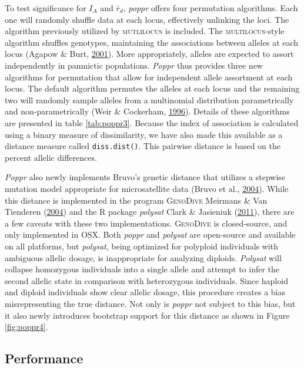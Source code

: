 \documentclass[double,11pt]{beavtex}
\begin{document}
  To test significance for \(I_A\) and \(\bar{r}_d\), \emph{poppr} offers
  four permutation algorithms. Each one will randomly shuffle data at each
  locus, effectively unlinking the loci. The algorithm previously utilized
  by \textsc{mutlilocus} is included. The \textsc{multilocus}-style
  algorithm shuffles genotypes, maintaining the associations between
  alleles at each locus (Agapow \& Burt,
  \protect\hyperlink{ref-Agapow_2001}{2001}). More appropriately, alleles
  are expected to assort independently in panmictic populations.
  \emph{Poppr} thus provides three new algorithms for permutation that
  allow for independent allele assortment at each locus. The default
  algorithm permutes the alleles at each locus and the remaining two will
  randomly sample alleles from a multinomial distribution parametrically
  and non-parametrically (Weir \& Cockerham,
  \protect\hyperlink{ref-weir1996genetic}{1996}). Details of these
  algorithms are presented in table \ref{tab:poppr3}. Because the index of
  association is calculated using a binary measure of dissimilarity, we
  have also made this available as a distance measure called
  \texttt{diss.dist()}. This pairwise distance is based on the percent
  allelic differences.
  
  \emph{Poppr} also newly implements Bruvo's genetic distance that
  utilizes a stepwise mutation model appropriate for microsatellite data
  (Bruvo et al., \protect\hyperlink{ref-bruvo2004simple}{2004}). While
  this distance is implemented in the program \textsc{ GenoDive} Meirmans
  \& Van Tienderen (\protect\hyperlink{ref-meirmans2004genotype}{2004})
  and the R package \emph{polysat} Clark \& Jasieniuk
  (\protect\hyperlink{ref-polysat}{2011}), there are a few caveats with
  these two implementations. \textsc{GenoDive} is closed-source, and only
  implemented in OSX. Both \emph{poppr} and \emph{polysat} are open-source
  and available on all platforms, but \emph{polysat}, being optimized for
  polyploid individuals with ambiguous allelic dosage, is inappropriate
  for analyzing diploids. \emph{Polysat} will collapse homozygous
  individuals into a single allele and attempt to infer the second allelic
  state in comparison with heterozygous individuals. Since haploid and
  diploid individuals show clear allelic dosage, this procedure creates a
  bias misrepresenting the true distance. Not only is \emph{poppr} not
  subject to this bias, but it also newly introduces bootstrap support for
  this distance as shown in Figure \ref{fig:poppr4}.
  
  \subsection{Performance}\label{performance-1}
  
\end{document}
